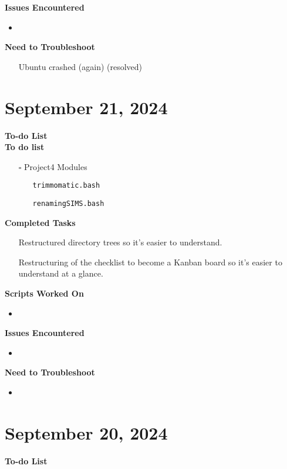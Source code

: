 \documentclass[11pt]{report}
\newcommand{\done}{\checkmark}
\newcommand{\pending}{$\square$}
\begin{document}
{\textbf{Issues Encountered}
\begin{itemize}
	\item  
\end{itemize}

\textbf{Need to Troubleshoot}
\begin{itemize}
	\item [\done] Ubuntu crashed (again) (resolved)
\end{itemize}


\newpage
\section{September 21, 2024}
\textbf{To-do List} \\


\textbf{To do list}
\begin{itemize}
	\item [\pending] Project4 Modules
	\begin{itemize}
		\item [\done] \texttt{trimmomatic.bash}
		\item [\done] \texttt{renamingSIMS.bash}
	\end{itemize}
\end{itemize}

\textbf{Completed Tasks} 
\begin{itemize}
	\item [\done] Restructured directory trees so it's easier to understand. 
	\item [\done] Restructuring of the checklist to become a Kanban board so it's easier to understand at a glance.
\end{itemize}

\textbf{Scripts Worked On}
\begin{itemize}
	\item 
\end{itemize}


\textbf{Issues Encountered}
\begin{itemize}
	\item  
\end{itemize}

\textbf{Need to Troubleshoot}
\begin{itemize}
	\item 
\end{itemize}

\newpage

\newpage
\section{September 20, 2024}
\textbf{To-do List} \\


}
\end{document}
